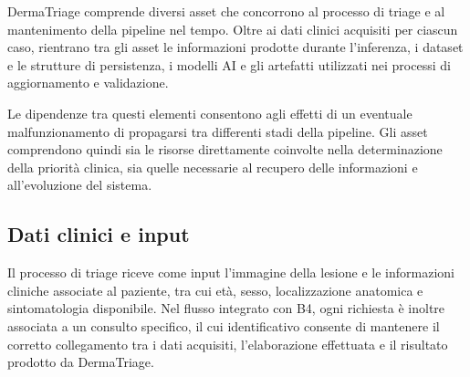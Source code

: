 DermaTriage comprende diversi asset che concorrono al processo di triage
e al mantenimento della pipeline nel tempo. Oltre ai dati clinici acquisiti
per ciascun caso, rientrano tra gli asset le informazioni prodotte durante
l'inferenza, i dataset e le strutture di persistenza, i modelli AI e gli
artefatti utilizzati nei processi di aggiornamento e validazione.

Le dipendenze tra questi elementi consentono agli effetti di un eventuale
malfunzionamento di propagarsi tra differenti stadi della pipeline. Gli asset
comprendono quindi sia le risorse direttamente coinvolte nella determinazione
della priorità clinica, sia quelle necessarie al recupero delle informazioni
e all'evoluzione del sistema.

\subsection{Dati clinici e input}
Il processo di triage riceve come input l'immagine della lesione e le informazioni cliniche associate al paziente, tra cui età, sesso, localizzazione anatomica e sintomatologia disponibile. Nel flusso integrato con B4, ogni richiesta è inoltre associata a un consulto specifico, il cui identificativo consente di mantenere il corretto collegamento tra i dati acquisiti, l'elaborazione effettuata e il risultato prodotto da DermaTriage.






